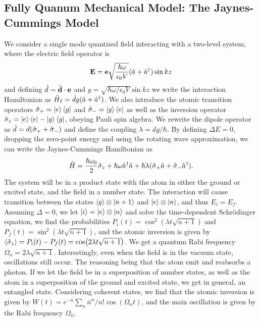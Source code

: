 \subsection{Fully Quanum Mechanical Model: The Jaynes-Cummings Model}
We consider a single mode quantized field interacting with a two-level system,
where the electric field operator is 
\begin{equation}
    \vec{E} = \vec{e} \sqrt{\frac{\hbar\omega}{\epsilon_0 V}} (\a + \ad)\sin kz
\end{equation}
and defining $\hat{d} = \hat{\bm{\mathrm{d}}} \cdot \bm{\mathrm{e}}$ and $g = \sqrt{\hbar\omega / \epsilon_0 V} \sin kz$ we write the interaction Hamiltonian as $\hat{H}_I = \hat{d}g (\hat{a} + \hat{a}^\dagger)$. We also introduce the atomic transition operators $\hat{\sigma}_+ = \ket{e}\bra{g}$ and $\hat{\sigma}_- = \ket{g}\bra{e}$ as well as the inversion operator $\hat{\sigma}_z = \ket{e}\bra{e} - \ket{g}\bra{g}$, obeying Pauli spin algebra. We rewrite the dipole operator as $\hat{d} = d(\hat{\sigma}_+ + \hat{\sigma}_-)$ and define the coupling $\lambda = dg/\hbar$. By defining $\Delta E=0$, dropping the zero-point energy and using the rotating wave approximation, we can write the Jaynes-Cummings Hamiltonian as
\begin{equation}
    \hat{H} = \frac{\hbar\omega_0}{2} \hat{\sigma}_z + \hbar\omega \hat{a}^\dagger\hat{a} + \hbar\lambda (\hat{\sigma}_+\hat{a} + \hat{\sigma}_-\hat{a}^\dagger).
\end{equation}
The system will be in a product state with the atom in either the ground or excited state, and the field in a number state. The interaction will cause transition between the states $\ket{g}\otimes\ket{n+1}$ and $\ket{e}\otimes\ket{n}$, and thus $E_i = E_f$. Assuming $\Delta = 0$, we let $\ket{i} = \ket{e}\otimes\ket{n}$ and solve the time-dependent Schrödinger equation, we find the probabilities $P_i(t)=\cos^2(\lambda t \sqrt{n+1})$ and $P_f(t)=\sin^2(\lambda t \sqrt{n+1})$, and the atomic inversion is given by $\langle \hat{\sigma}_z\rangle = P_i(t) - P_f(t) = \cos(2\lambda t \sqrt{n+1})$. We get a quantum Rabi frequency $\Omega_n = 2\lambda\sqrt{n+1}$. Interestingly, even when the field is in the vacuum state, oscillations still occur. The reasoning being that the atom emit and reabsorbs a photon. If we let the field be in a superposition of number states, as well as the atom in a superposition of the ground and excited state, we get in general, an entangled state. Considering coherent states, we find that the atomic inversion is given by $W(t) = e^{-\bar{n}}\sum_n \bar{n}^n / n! \cos(\Omega_n t)$, and the main oscillation is given by the Rabi frequency $\Omega_{\bar{n}}$. 


